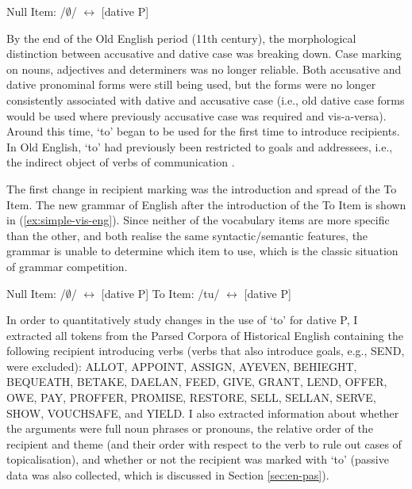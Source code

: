 	\begin{exe}
		\ex \label{ex:old-eng-vi}
		\begin{xlist}
			\ex Null Item:  /$\emptyset$/ $\leftrightarrow$ [dative P]
		\end{xlist}
	\end{exe}
	
	By the end of the Old English period (11th century), the morphological distinction between accusative and dative case was breaking down. Case marking on nouns, adjectives and determiners was no longer reliable. Both accusative and dative pronominal forms were still being used, but the forms were no longer consistently associated with dative and accusative case (i.e., old dative case forms would be used where previously accusative case was required and vis-a-versa). Around this time, `to' began to be used for the first time to introduce recipients. In Old English, `to' had previously been restricted to goals and addressees, i.e., the indirect object of verbs of communication \citep{Allen.1999,McFadden.2002,OED.2013}.

	The first change in recipient marking was the introduction and spread of the To Item. The new grammar of English after the introduction of the To Item is shown in (\ref{ex:simple-vis-eng}). Since neither of the vocabulary items are more specific than the other, and both realise the same syntactic/semantic features, the grammar is unable to determine which item to use, which is the classic situation of grammar competition.

	\begin{exe}
		\ex \label{ex:simple-vis-eng}
		\begin{xlist}
			\ex Null Item: /$\emptyset$/ $\leftrightarrow$ [dative P]
			\ex To Item: /tu/ $\leftrightarrow$ [dative P]
		\end{xlist}
	\end{exe}


	In order to quantitatively study changes in the use of `to' for dative P, I extracted all tokens from the Parsed Corpora of Historical English \citep{Kroch.2000,Taylor.2003,Kroch.2004,Taylor.2006,Kroch.2010} containing the following recipient introducing verbs (verbs that also introduce goals, e.g., SEND, were excluded): ALLOT, APPOINT, ASSIGN, AYEVEN, BEHIEGHT, BEQUEATH, BETAKE, DAELAN, FEED, GIVE, GRANT, LEND, OFFER, OWE, PAY, PROFFER, PROMISE, RESTORE, SELL, SELLAN, SERVE, SHOW, VOUCHSAFE, and YIELD. I also extracted information about whether the arguments were full noun phrases or pronouns, the relative order of the recipient and theme (and their order with respect to the verb to rule out cases of topicalisation), and whether or not the recipient was marked with `to' (passive data was also collected, which is discussed in Section \ref{sec:en-pas}). 

